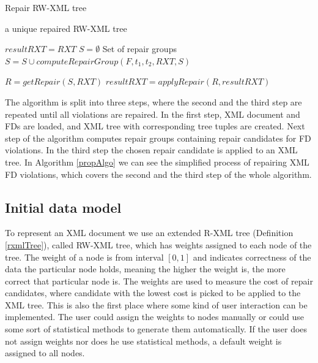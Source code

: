 \begin{algorithm}
\caption{Repair RW-XML tree}
\label{propAlgo}
\begin{algorithmic}[1]
\ENSURE a unique repaired RW-XML tree

\STATE $resultRXT = RXT$
    \STATE $S = \emptyset$ \COMMENT Set of repair groups
		    \STATE $S = S \cup computeRepairGroup(F, t_1, t_2, RXT, S)$
	    \ENDFOR
    \ENDFOR

    \STATE $R = getRepair(S, RXT)$
    \STATE $resultRXT = applyRepair(R, resultRXT)$
\ENDWHILE

\end{algorithmic}
\end{algorithm}

The algorithm is split into three steps, where the second and the third step are repeated until all violations are repaired. In the first step, XML document and FDs are loaded, and XML tree with corresponding tree tuples are created. Next step of the algorithm computes repair groups containing repair candidates for FD violations. In the third step the chosen repair candidate is applied to an XML tree. In Algorithm \ref{propAlgo} we can see the simplified process of repairing XML FD violations, which covers the second and the third step of the whole algorithm.

\subsection{Initial data model}

To represent an XML document we use an extended R-XML tree (Definition \ref{rxmlTree}), called RW-XML tree, which has weights assigned to each node of the tree. The weight of a node is from interval $[0,1]$ and indicates correctness of the data the particular node holds, meaning the higher the weight is, the more correct that particular node is. The weights are used to measure the cost of repair candidates, where candidate with the lowest cost is picked to be applied to the XML tree. This is also the first place where some kind of user interaction can be implemented. The user could assign the weights to nodes manually or could use some sort of statistical methods to generate them automatically. If the user does not assign weights nor does he use statistical methods, a default weight is assigned to all nodes.


